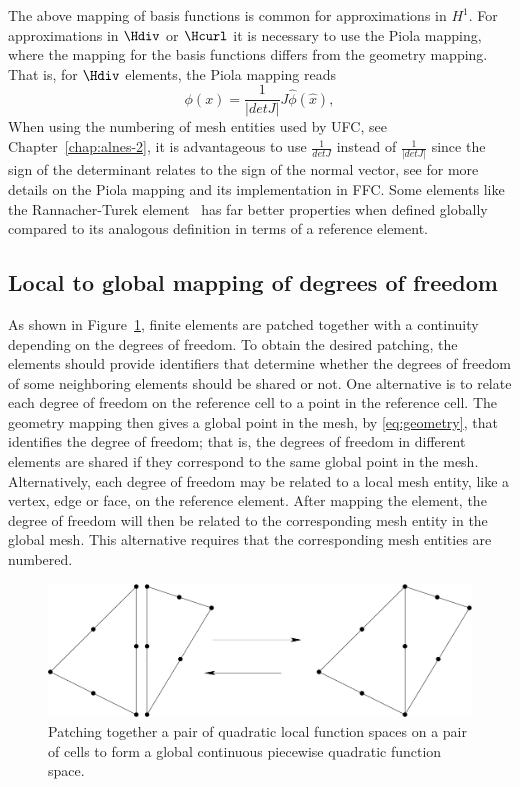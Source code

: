 The above mapping of basis functions is common for approximations in
$H^1$. For approximations in $\Hdiv$ or $\Hcurl$ it is necessary to use
the Piola mapping, where the mapping for the basis functions differs
from the geometry mapping. That is, for $\Hdiv$ elements, the Piola
mapping reads
\begin{equation}
\phi(x) = \frac{1}{|detJ|} J \hat{\phi}(\hat x),
\end{equation}
When using the numbering of mesh entities used by UFC, see
Chapter~\ref{chap:alnes-2}, it is advantageous to use $\frac{1}{detJ}$
instead of $\frac{1}{|detJ|}$ since the sign of the determinant relates
to the sign of the normal vector, see \citet{RognesKirbyLogg2009} for more
details on the Piola mapping and its implementation in FFC.  Some elements
like the Rannacher-Turek element~\citep{Turek1999,RannacherTurek1992}
has far better properties when defined globally compared to its analogous
definition in terms of a reference element.

\subsection{Local to global mapping of degrees of freedom}

As shown in Figure~\ref{fig:kirby-1:patch}, finite elements are
patched together with a continuity depending on the degrees of freedom.
To obtain the desired patching, the elements should provide identifiers
that determine whether the degrees of freedom of some neighboring
elements should be shared or not.  One alternative is to relate each
degree of freedom on the reference cell to a point in the reference
cell. The geometry mapping then gives a global point in the mesh, by
\eqref{eq:geometry}, that identifies the degree of freedom; that is, the
degrees of freedom in different elements are shared if they correspond to
the same global point in the mesh.  Alternatively, each degree of freedom
may be related to a local mesh entity, like a vertex, edge or face, on the
reference element. After mapping the element, the degree of freedom will
then be related to the corresponding mesh entity in the global mesh. This
alternative requires that the corresponding mesh entities are numbered.

\begin{figure}
  \centering
  \includegraphics[width=\largefig]{chapters/kirby-1/pdf/patch.pdf}
  \caption{Patching together a pair of quadratic local function
    spaces on a pair of cells to form a global continuous
    piecewise quadratic function space.}
  \label{fig:kirby-1:patch}
\end{figure}
